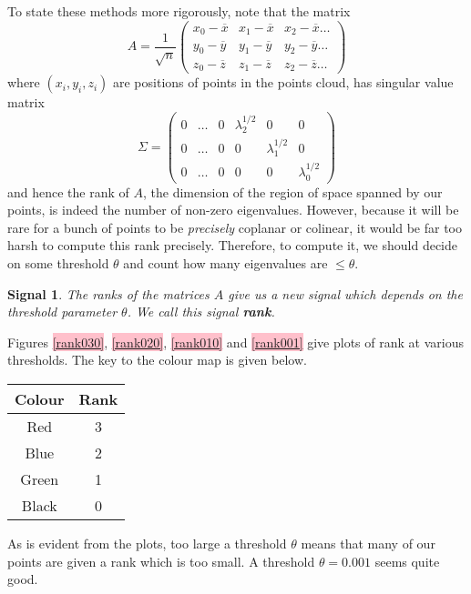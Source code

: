 \documentclass[a4paper,11pt,twoside]{article}
\newtheorem*{signals}{Signal}
\theoremstyle{definition}
\theoremstyle{remark}
\newcommand{\sh}[1]{\colorbox{pink}{#1}}
\newcommand{\lnk}[1]{\sh{\hyperref[#1]{\ref*{#1}}}}
\newenvironment{sigs}
   {\colorlet{shadecolor}{green!50}\begin{shaded}\begin{signals}}
   {\end{signals}\end{shaded}}
\begin{document}
To state these methods more rigorously, note that the matrix 
\begin{displaymath}
A=\frac{1}{\sqrt{n}}
\begin{pmatrix}
x_0-\overline x& x_1-\overline x&x_2-\overline x\dots \\
y_0-\overline y& y_1-\overline y&y_2-\overline y\dots \\
z_0-\overline z& z_1-\overline z&z_2-\overline z\dots 
\end{pmatrix}
\end{displaymath}
where $(x_i,y_i,z_i)$ are positions of points in the points cloud, has singular value matrix 
\begin{displaymath}
\Sigma=\begin{pmatrix}
0&\dots&0&\lambda_2^{1/2}& 0&0 \\
0&\dots&0&0& \lambda_1^{1/2}&0 \\
0&\dots&0&0& 0&\lambda_0^{1/2} 
\end{pmatrix}
\end{displaymath}
and hence the rank of $A$, the dimension of the region of space spanned by our points, is indeed the number of non-zero eigenvalues. However, because it will be rare for a bunch of points to be \emph{precisely} coplanar or colinear, it would be far too harsh to compute this rank precisely. Therefore, to compute it, we should decide on some threshold $\theta$ and count how many eigenvalues are $\leqslant \theta$. 
\begin{sigs}The ranks of the matrices $A$ give us a new signal which depends on the threshold parameter $\theta$. We call this signal \textbf{rank}.
\end{sigs}
Figures \lnk{rank030}, \lnk{rank020}, \lnk{rank010} and \lnk{rank001} give plots of rank at various thresholds. The key to the colour map is given below.
\begin{center}
\begin{tabular}{c|c}
Colour & Rank\\
\hline
Red & 3\\
Blue & 2\\
Green & 1\\
Black & 0\\
\end{tabular}
\end{center}
As is evident from the plots, too large a threshold $\theta$ means that many of our points are given a rank which is too small. A threshold $\theta =0.001$ seems quite good. 
\end{document}
